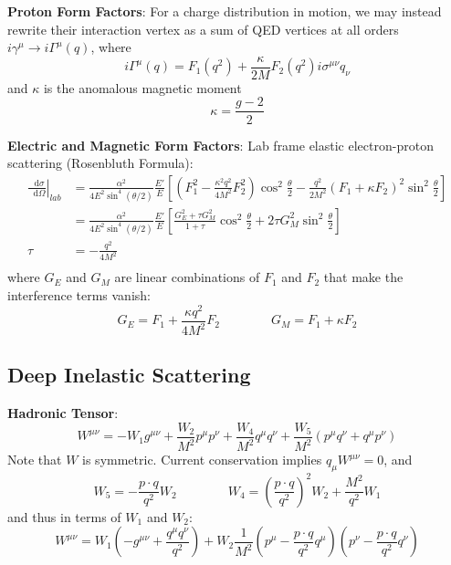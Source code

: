 \documentclass[12pt]{article}
\newcommand{\diff}{\mathop{}\!\mathrm{d}}
\theoremstyle{definition}
\begin{document}
\textbf{Proton Form Factors}: For a charge distribution in motion, we may instead rewrite their interaction
vertex as a sum of QED vertices at all orders $i\gamma^\mu \to i\Gamma^\mu(q)$, where
\begin{equation*}
    i\Gamma^\mu(q) = F_1 (q^2) + \frac{\kappa}{2M} F_2(q^2) i \sigma^{\mu\nu} q_\nu
\end{equation*}
and $\kappa$ is the anomalous magnetic moment
\begin{equation*}
    \kappa = \frac{g-2}{2}
\end{equation*}

\textbf{Electric and Magnetic Form Factors}: Lab frame elastic electron-proton scattering (Rosenbluth Formula):
\begin{equation*}
\begin{split}
     \left. \frac{\diff \sigma}{\diff \Omega} \right|_{lab}
        &= \frac{\alpha^2}{4E^2 \sin^4(\theta/2)} \frac{E'}{E} \left[ \left( F_1^2 - \frac{\kappa^2 q^2}{4M^2} F_2^2 \right) \cos^2 \frac{\theta}{2} - \frac{q^2}{2M^2} (F_1 + \kappa F_2)^2 \sin^2 \frac{\theta}{2} \right] \\
        &= \frac{\alpha^2}{4E^2 \sin^4(\theta/2)} \frac{E'}{E} \left[ \frac{G_E^2 + \tau G^2_M}{1 + \tau} \cos^2 \frac{\theta}{2} + 2\tau G^2_M \sin^2 \frac{\theta}{2} \right] \\
     \tau &= -\frac{q^2}{4M^2} \\
\end{split}
\end{equation*}
where $G_E$ and $G_M$ are linear combinations of $F_1$ and $F_2$ that make the interference terms vanish:
\begin{equation*}
    G_E = F_1 + \frac{\kappa q^2}{4M^2} F_2 \qquad \qquad G_M = F_1 + \kappa F_2
\end{equation*}

\subsection{Deep Inelastic Scattering}
\textbf{Hadronic Tensor}:
\begin{equation*}
    W^{\mu\nu} = -W_1 g^{\mu\nu} + \frac{W_2}{M^2} p^\mu p^\nu + \frac{W_4}{M^2} q^\mu q^\nu + \frac{W_5}{M^2} (p^\mu q^\nu + q^\mu p^\nu)
\end{equation*}
Note that $W$ is symmetric. Current conservation implies $q_\mu W^{\mu\nu} = 0$, and
\begin{equation*}
    W_5 = - \frac{p \cdot q}{q^2} W_2 \qquad \qquad W_4 = \left( \frac{p \cdot q}{q^2} \right)^2 W_2 + \frac{M^2}{q^2} W_1
\end{equation*}
and thus in terms of $W_1$ and $W_2$:
\begin{equation*}
    W^{\mu\nu} = W_1 \left( -g^{\mu\nu} + \frac{q^\mu q^\nu}{q^2} \right) + W_2 \frac{1}{M^2} \left( p^\mu - \frac{p \cdot q}{q^2} q^\mu \right) \left( p^\nu - \frac{p \cdot q}{q^2} q^\nu \right) 
\end{equation*}
\end{document}
